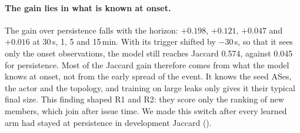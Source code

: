 \paragraph{The gain lies in what is known at onset.}
The gain over persistence falls with the horizon: $+0.198$, $+0.121$, $+0.047$ and $+0.016$ at 30\,s, 1, 5 and 15\,min.
With its trigger shifted by $-30$\,s, so that it sees only the onset observations, the model still reaches Jaccard 0.574, against 0.045 for persistence.
Most of the Jaccard gain therefore comes from what the model knows at onset, not from the early spread of the event.
It knows the seed ASes, the actor and the topology, and training on large leaks only gives it their typical final size.
This finding shaped R1 and R2: they score only the ranking of new members, which join after issue time.
We made this switch after every learned arm had stayed at persistence in development Jaccard ().


